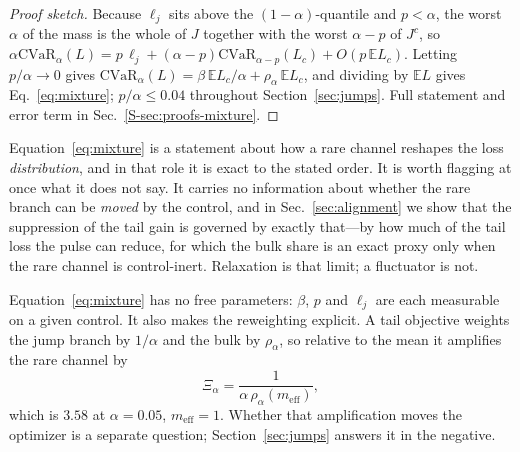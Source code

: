 \documentclass[aps,pra,twocolumn,superscriptaddress,reprint,nofootinbib,floatfix]{revtex4-2}
\theoremstyle{definition}
\newcommand{\cvar}{\mathrm{CVaR}}
\newcommand{\E}{\mathbb{E}}
\newcommand{\sref}[1]{Sec.~\ref{S-#1}}
\begin{document}
\begin{proof}[Proof sketch]
Because $\ell_j$ sits above the $(1-\alpha)$-quantile and $p<\alpha$, the
worst $\alpha$ of the mass is the whole of $J$ together with the worst
$\alpha-p$ of $J^c$, so
$\alpha\cvar_\alpha(L)=p\,\ell_j+(\alpha-p)\cvar_{\alpha-p}(L_c)+O(p\,\E L_c)$.
Letting $p/\alpha\to0$ gives
$\cvar_\alpha(L)=\beta\,\E L_c/\alpha+\rho_\alpha\,\E L_c$, and dividing by
$\E L$ gives Eq.~\eqref{eq:mixture}; $p/\alpha\le0.04$ throughout
Section~\ref{sec:jumps}. Full statement and error term in
\sref{sec:proofs-mixture}.
\end{proof}

Equation~\eqref{eq:mixture} is a statement about how a rare channel reshapes
the loss \emph{distribution}, and in that role it is exact to the stated
order. It is worth flagging at once what it does not say. It carries no
information about whether the rare branch can be \emph{moved} by the
control, and in Sec.~\ref{sec:alignment} we show that the suppression of the
tail gain is governed by exactly that---by how much of the tail loss the
pulse can reduce, for which the bulk share is an exact proxy only when the
rare channel is control-inert. Relaxation is that limit; a fluctuator is not.

Equation~\eqref{eq:mixture} has no free parameters: $\beta$, $p$ and $\ell_j$
are each measurable on a given control. It also makes the reweighting
explicit. A tail objective weights the jump branch by $1/\alpha$ and the bulk
by $\rho_\alpha$, so relative to the mean it amplifies the rare channel by
\begin{equation}
\Xi_\alpha=\frac{1}{\alpha\,\rho_\alpha(m_{\mathrm{eff}})},
\label{eq:xi}
\end{equation}
which is $3.58$ at $\alpha=0.05$, $m_{\mathrm{eff}}=1$. Whether that
amplification moves the optimizer is a separate question;
Section~\ref{sec:jumps} answers it in the negative.
\end{document}

